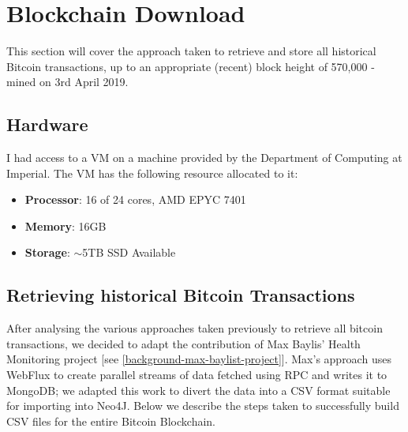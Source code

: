\chapter{Blockchain Download}\label{section-blockchain-download}
This section will cover the approach taken to retrieve and store all historical Bitcoin transactions, up to an appropriate (recent) block height of 570,000 - mined on 3rd April 2019. 

\section{Hardware}\label{satoshi-specs}
I had access to a VM on a machine provided by the Department of Computing at Imperial.  The VM has the following resource allocated to it:
\begin{itemize}
    \item \textbf{Processor}: 16 of 24 cores, AMD EPYC 7401
    \item \textbf{Memory}: 16GB
    \item \textbf{Storage}: $\sim$5TB SSD Available
\end{itemize}

\section{Retrieving historical Bitcoin Transactions}
After analysing the various approaches taken previously to retrieve all bitcoin transactions, we decided to adapt the contribution of Max Baylis' Health Monitoring project [see \ref{background-max-baylist-project}]. Max's approach uses WebFlux to create parallel streams of data fetched using RPC and writes it to MongoDB; we adapted this work to divert the data into a CSV format suitable for importing into Neo4J. Below we describe the steps taken to successfully build CSV files for the entire Bitcoin Blockchain. 

